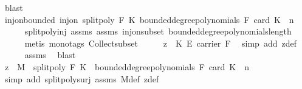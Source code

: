 \begin{isabellebody}
\ blast\isanewline
\ \ \isamarkupfalse%
\ inj{\isacharunderscore}{\kern0pt}on{\isacharunderscore}{\kern0pt}bounded{\isacharcolon}{\kern0pt}\ {\isachardoublequoteopen}inj{\isacharunderscore}{\kern0pt}on\ {\isacharparenleft}{\kern0pt}split{\isacharunderscore}{\kern0pt}poly\ F\ K{\isacharparenright}{\kern0pt}\ {\isacharparenleft}{\kern0pt}bounded{\isacharunderscore}{\kern0pt}degree{\isacharunderscore}{\kern0pt}polynomials\ F\ {\isacharparenleft}{\kern0pt}card\ K\ {\isacharplus}{\kern0pt}\ n{\isacharparenright}{\kern0pt}{\isacharparenright}{\kern0pt}{\isachardoublequoteclose}\isanewline
\ \ \ \ \isamarkupfalse%
\ split{\isacharunderscore}{\kern0pt}poly{\isacharunderscore}{\kern0pt}inj\ assms{\isacharparenleft}{\kern0pt}{}{\isacharparenright}{\kern0pt}\ assms{\isacharparenleft}{\kern0pt}{}{\isacharparenright}{\kern0pt}\ inj{\isacharunderscore}{\kern0pt}on{\isacharunderscore}{\kern0pt}subset\ bounded{\isacharunderscore}{\kern0pt}degree{\isacharunderscore}{\kern0pt}polynomials{\isacharunderscore}{\kern0pt}length\ \isanewline
\ \ \ \ \isamarkupfalse%
\ {\isacharparenleft}{\kern0pt}metis\ {\isacharparenleft}{\kern0pt}mono{\isacharunderscore}{\kern0pt}tags{\isacharparenright}{\kern0pt}\ Collect{\isacharunderscore}{\kern0pt}subset{\isacharparenright}{\kern0pt}\isanewline
\ \ \isamarkupfalse%
\ \isamarkupfalse%
\ {\isachardoublequoteopen}z\ {\isasymin}\ {\isacharparenleft}{\kern0pt}K\ {\isasymrightarrow}\isactrlsub E\ carrier\ F{\isacharparenright}{\kern0pt}{\isachardoublequoteclose}\ \isamarkupfalse%
\ {\isacharparenleft}{\kern0pt}simp\ add{\isacharcolon}{\kern0pt}\ z{\isacharunderscore}{\kern0pt}def{\isacharparenright}{\kern0pt}\isanewline
\ \ \ \ \isamarkupfalse%
\ assms\ \isamarkupfalse%
\ blast\isanewline
\ \ \isamarkupfalse%
\ {\isachardoublequoteopen}{\isacharbraceleft}{\kern0pt}z{\isacharbraceright}{\kern0pt}\ {\isasymtimes}\ M\ {\isasymsubseteq}\ split{\isacharunderscore}{\kern0pt}poly\ F\ K\ {\isacharbackquote}{\kern0pt}\ {\isacharparenleft}{\kern0pt}bounded{\isacharunderscore}{\kern0pt}degree{\isacharunderscore}{\kern0pt}polynomials\ F\ {\isacharparenleft}{\kern0pt}card\ K\ {\isacharplus}{\kern0pt}\ n{\isacharparenright}{\kern0pt}{\isacharparenright}{\kern0pt}{\isachardoublequoteclose}\isanewline
\ \ \ \ \isamarkupfalse%
\ {\isacharparenleft}{\kern0pt}simp\ add{\isacharcolon}{\kern0pt}\ split{\isacharunderscore}{\kern0pt}poly{\isacharunderscore}{\kern0pt}surj\ assms\ M{\isacharunderscore}{\kern0pt}def\ z{\isacharunderscore}{\kern0pt}def{\isacharparenright}{\kern0pt}\ \isanewline

\end{isabellebody}
